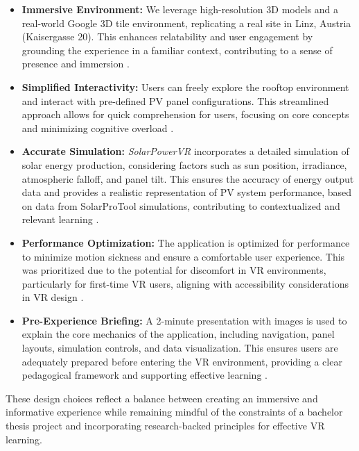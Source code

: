 \documentclass[draft, final]{vutinfth} %
\begin{document}
\begin{itemize}
    \item \textbf{Immersive Environment:} We leverage high-resolution 3D models and a real-world Google 3D tile environment, replicating a real site in Linz, Austria (Kaisergasse 20). This enhances relatability and user engagement by grounding the experience in a familiar context, contributing to a sense of presence and immersion \cite{HuAu2018VrExperience, Winn2002Immersion}.
    \item \textbf{Simplified Interactivity:} Users can freely explore the rooftop environment and interact with pre-defined PV panel configurations. This streamlined approach allows for quick comprehension for users, focusing on core concepts and minimizing cognitive overload \cite{Dalgarno2010Learning, Mikropoulos2011VrEducational}.
    \item \textbf{Accurate Simulation:} \textit{SolarPowerVR} incorporates a detailed simulation of solar energy production, considering factors such as sun position, irradiance, atmospheric falloff, and panel tilt. This ensures the accuracy of energy output data and provides a realistic representation of PV system performance, based on data from SolarProTool simulations, contributing to contextualized and relevant learning \cite{Dalgarno2010Learning, HuAu2018VrExperience}.
    \item \textbf{Performance Optimization:} The application is optimized for performance to minimize motion sickness and ensure a comfortable user experience. This was prioritized due to the potential for discomfort in VR environments, particularly for first-time VR users, aligning with accessibility considerations in VR design \cite{Lege2020VrProgress, Winn2002Immersion}.
    \item \textbf{Pre-Experience Briefing:} A 2-minute presentation with images is used to explain the core mechanics of the application, including navigation, panel layouts, simulation controls, and data visualization. This ensures users are adequately prepared before entering the VR environment, providing a clear pedagogical framework and supporting effective learning \cite{HuAu2018VrExperience, Lege2020VrProgress}.
\end{itemize}

These design choices reflect a balance between creating an immersive and informative experience while remaining mindful of the constraints of a bachelor thesis project and incorporating research-backed principles for effective VR learning.
\end{document}
